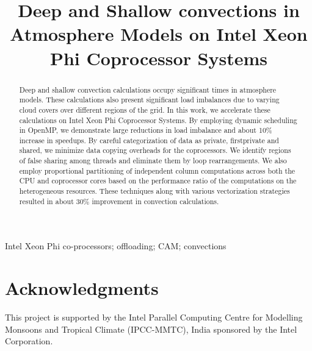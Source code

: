 \documentclass[conference]{IEEEtran}
\begin{document}
 

\title{Deep and Shallow convections in Atmosphere Models on Intel{\textregistered} Xeon Phi{\texttrademark} Coprocessor Systems}
\author{
}

\maketitle


\begin{abstract}
Deep and shallow convection calculations occupy significant times in atmosphere models. These calculations also present significant load imbalances due to varying cloud covers over different regions of the grid. In this work, we accelerate these calculations on Intel{\textregistered} Xeon Phi{\texttrademark} Coprocessor Systems. By employing dynamic scheduling in OpenMP, we demonstrate large reductions in load imbalance and about 10\% increase in speedups. By careful categorization of data as private, firstprivate and shared, we minimize data copying overheads for the coprocessors. We identify regions of false sharing among threads and eliminate them by loop rearrangements. We also employ proportional partitioning of independent column computations across both the CPU and coprocessor cores based on the performance ratio of the computations on the heterogeneous resources. These techniques along with various vectorization strategies resulted in about 30\% improvement in convection calculations.
\end{abstract}

\begin{IEEEkeywords}
Intel Xeon Phi co-processors; offloading; CAM; convections
\end{IEEEkeywords}









\section*{Acknowledgments}
This project is supported by the Intel{\textregistered} Parallel Computing Centre for Modelling Monsoons and Tropical Climate (IPCC-MMTC), India sponsored by the Intel{\textregistered} Corporation.



\end{document}

